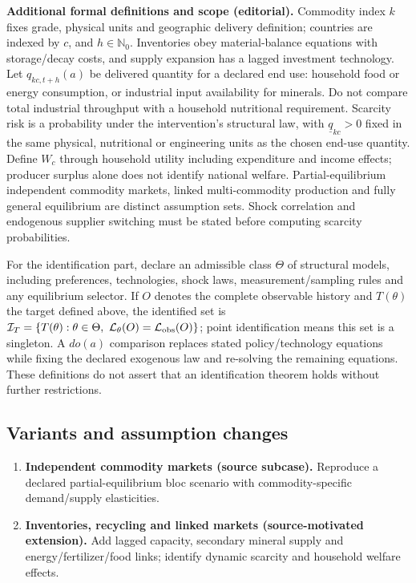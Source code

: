 \documentclass[11pt,a4paper]{article}
\begin{document}
\textbf{Additional formal definitions and scope (editorial).} Commodity index \(k\) fixes grade, physical units and geographic delivery definition; countries are indexed by \(c\), and \(h\in\mathbb N_0\). Inventories obey material-balance equations with storage/decay costs, and supply expansion has a lagged investment technology. Let \(q_{kc,t+h}(a)\) be delivered quantity for a declared end use: household food or energy consumption, or industrial input availability for minerals. Do not compare total industrial throughput with a household nutritional requirement. Scarcity risk is a probability under the intervention's structural law, with \(\underline q_{kc}>0\) fixed in the same physical, nutritional or engineering units as the chosen end-use quantity. Define \(W_c\) through household utility including expenditure and income effects; producer surplus alone does not identify national welfare. Partial-equilibrium independent commodity markets, linked multi-commodity production and fully general equilibrium are distinct assumption sets. Shock correlation and endogenous supplier switching must be stated before computing scarcity probabilities.

For the identification part, declare an admissible class \(\Theta\) of structural models, including preferences, technologies, shock laws, measurement/sampling rules and any equilibrium selector. If \(O\) denotes the complete observable history and \(T(\theta)\) the target defined above, the identified set is \(\mathcal I_T=\{T(\theta):\theta\in\Theta,\ \mathcal L_\theta(O)=\mathcal L_{\rm obs}(O)\}\); point identification means this set is a singleton. A \(do(a)\) comparison replaces stated policy/technology equations while fixing the declared exogenous law and re-solving the remaining equations. These definitions do not assert that an identification theorem holds without further restrictions.
\subsection*{Variants and assumption changes}
\begin{enumerate}
\item \textbf{Independent commodity markets (source subcase).} Reproduce a declared partial-equilibrium bloc scenario with commodity-specific demand/supply elasticities.
\item \textbf{Inventories, recycling and linked markets (source-motivated extension).} Add lagged capacity, secondary mineral supply and energy/fertilizer/food links; identify dynamic scarcity and household welfare effects.
\end{enumerate}
\end{document}
